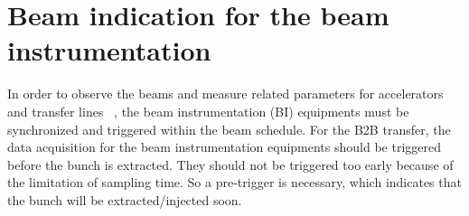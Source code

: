 \section{Beam indication for the beam instrumentation}
In order to observe the beams and measure related parameters for accelerators and transfer lines ~\cite{forck_lecture_2011}, the beam instrumentation (\gls{BI}) equipments must be synchronized and triggered within the beam schedule. For the B2B transfer, the data acquisition for the beam instrumentation equipments should be triggered before the bunch is extracted. They should not be triggered too early because of the limitation of sampling time. So a pre-trigger is necessary, which indicates that the bunch will be extracted/injected soon. 


%
%


